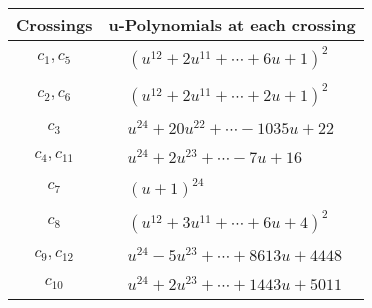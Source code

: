 \documentclass[1p]{elsarticle_modified}
\theoremstyle{definition}
\begin{document}
\begin{tabular}{m{50pt}|m{274pt}}
Crossings & \hspace{64pt}u-Polynomials at each crossing \\
\hline $$\begin{aligned}c_{1},c_{5}\end{aligned}$$&$\begin{aligned}
&(u^{12}+2 u^{11}+\cdots+6 u+1)^{2}
\end{aligned}$\\
\hline $$\begin{aligned}c_{2},c_{6}\end{aligned}$$&$\begin{aligned}
&(u^{12}+2 u^{11}+\cdots+2 u+1)^{2}
\end{aligned}$\\
\hline $$\begin{aligned}c_{3}\end{aligned}$$&$\begin{aligned}
&u^{24}+20 u^{22}+\cdots-1035 u+22
\end{aligned}$\\
\hline $$\begin{aligned}c_{4},c_{11}\end{aligned}$$&$\begin{aligned}
&u^{24}+2 u^{23}+\cdots-7 u+16
\end{aligned}$\\
\hline $$\begin{aligned}c_{7}\end{aligned}$$&$\begin{aligned}
&(u+1)^{24}
\end{aligned}$\\
\hline $$\begin{aligned}c_{8}\end{aligned}$$&$\begin{aligned}
&(u^{12}+3 u^{11}+\cdots+6 u+4)^{2}
\end{aligned}$\\
\hline $$\begin{aligned}c_{9},c_{12}\end{aligned}$$&$\begin{aligned}
&u^{24}-5 u^{23}+\cdots+8613 u+4448
\end{aligned}$\\
\hline $$\begin{aligned}c_{10}\end{aligned}$$&$\begin{aligned}
&u^{24}+2 u^{23}+\cdots+1443 u+5011
\end{aligned}$\\
\hline
\end{tabular}\\~\\
\end{document}
